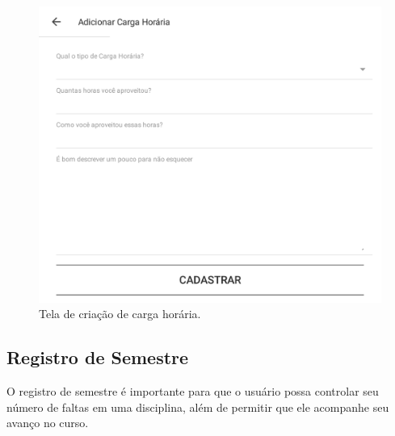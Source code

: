 \begin{figure}[H]
	   \centering
	   		\includegraphics[scale=0.25]{pics/c3/9-createch.png}
	   \caption{Tela de criação de carga horária.}
	   \label{createch}
\end{figure}

\subsection{Registro de Semestre}
O registro de semestre é importante para que o usuário possa controlar seu número de faltas em uma disciplina, além de permitir que ele acompanhe seu avanço no curso. 


